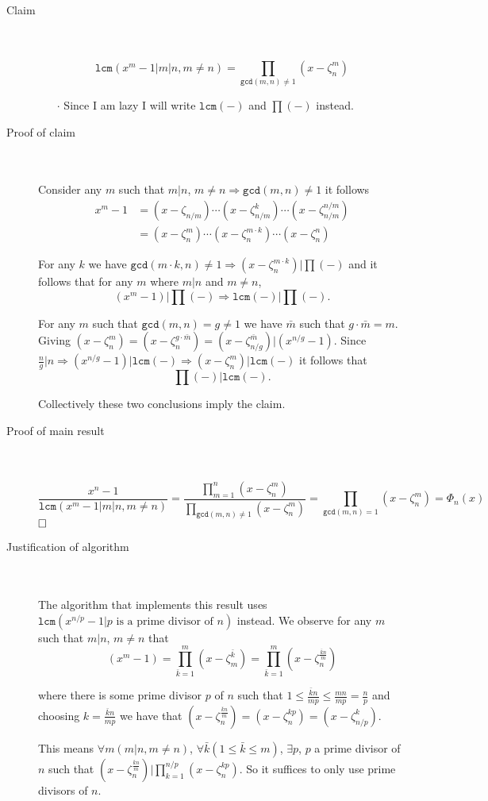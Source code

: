 \documentclass[10pt]{report}
\newcommand{\state}[1]{\item[#1] \textcolor{white}{.} \\ \textcolor{white}{.} \\ }
\newcommand{\point}[1]{\begin{itemize} \item[$\cdot$] #1 \end{itemize}}
\newcommand{\brac}[1]{\left( #1 \right)}
\renewcommand{\implies}{\Rightarrow}
\newcommand{\lcm}[1]{\texttt{lcm}\brac{#1}}
\renewcommand{\gcd}[1]{\texttt{gcd}\brac{#1}}
\begin{document}
\begin{description}
\state{Claim}
$$ \lcm{x^m-1 \Big | m|n,m\neq n} = \prod_{\gcd{m,n} \neq 1} (x-\zeta_n^m)$$

\point{Since I am lazy I will write $\lcm{-}$ and $\prod (-)$ instead.}

\state{Proof of claim}
Consider any $m$ such that $m|n$, $m \neq n  \implies \gcd{m,n} \neq 1$ it follows
\begin{align*}
x^m-1 	{}& = (x-\zeta_{n/m}) \cdots (x- \zeta^k_{n/m}) \cdots (x-\zeta_{n/m}^{n/m}) \\
		{}& = (x-\zeta_n^m) \cdots (x-\zeta_n^{m \cdot k}) \cdots (x-\zeta_n^{n})
\end{align*}

For any $k$ we have  $\gcd{m\cdot k , n} \neq 1 \implies (x-\zeta_n^{m\cdot k}) \big | \prod (-)$ and it follows that for any $m$ where $m|n$ and $m \neq n$, $$\label{P1} (x^m-1) \big | \prod(-) \implies \lcm{-} \big | \prod(-).$$

For any $m$ such that $\gcd{m,n} = g \neq 1$ we have $\bar m$ such that $g \cdot \bar m = m$. Giving $(x-\zeta_n^m)=(x-\zeta_n^{g\cdot \bar m})=(x-\zeta_{n/g}^{\bar m}) \big | (x^{n/g}-1)$. Since  $\frac n g \big | n \implies (x^{n/g}-1) \big | \lcm{-} \implies (x-\zeta_n^m) \big | \lcm{-}$ it follows that $$\prod (-) \Big |  \lcm{-}. $$

Collectively these two conclusions imply the claim.

\state{Proof of main result}
$$ \frac {x^n-1} {\lcm{x^m-1\Big | m|n,m\neq n}} = \frac {\prod_{m=1}^n (x-\zeta_n^m)} {\prod_{\gcd{m,n} \neq 1} (x-\zeta_n^m)} = \prod_{\gcd{m,n}=1} (x-\zeta_n^m) = \Phi_n(x)$$
$\hfill \Box$

\state{Justification of algorithm}
The algorithm that implements this result uses $\lcm{x^{n/p}-1 \Big | p \text{ is a prime divisor of } n}$ instead. We observe for any $m$ such that $m|n$, $m \neq n$ that
$$(x^m-1) = \prod_{\bar k=1}^m (x-\zeta_m^{\bar k})=\prod_{\bar k =1}^m (x-\zeta_n^{\frac {\bar k n} {m}})$$ 

where there is some prime divisor $p$ of $n$ such that $1 \leq \frac {\bar k n} {m p} \leq \frac {mn} {mp} = \frac {n} {p}$ and choosing $k= \frac {\bar k n} {m p}$ we have that $(x-\zeta_n^{\frac {\bar k n} {m}})=(x-\zeta_n^{kp})=(x-\zeta_{n/p}^k)$.

This means $\forall m \brac{m|n,m\neq n}$, $\forall \bar k \brac{1 \leq \bar k \leq m}$, $\exists p$, $p$ a prime divisor of $n$ such that 
$(x-\zeta_n^{\frac {\bar k n} {m}}) \Big | \prod_{k=1}^{n/p} (x-\zeta_n^{k p})$. So it suffices to only use prime divisors of $n$.

\end{description}
\end{document}
